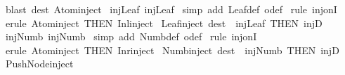 \begin{isabellebody}
%
\isadelimproof
%
\endisadelimproof
%
\isatagproof
{}\isamarkupfalse%
\ {\isacharparenleft}blast\ dest{\isacharbang}{\isacharcolon}\ Atom{\isacharunderscore}inject{\isacharparenright}%
\endisatagproof
{\isafoldproof}%
%
\isadelimproof
\isanewline
%
\endisadelimproof
\isanewline
{}\isamarkupfalse%
\ inj{\isacharunderscore}Leaf{\isacharcolon}\ {\isachardoublequoteopen}inj{\isacharparenleft}Leaf{\isacharparenright}{\isachardoublequoteclose}\isanewline
%
\isadelimproof
%
\endisadelimproof
%
\isatagproof
{}\isamarkupfalse%
\ {\isacharparenleft}simp\ add{\isacharcolon}\ Leaf{\isacharunderscore}def\ o{\isacharunderscore}def{\isacharparenright}\isanewline
{}\isamarkupfalse%
\ {\isacharparenleft}rule\ inj{\isacharunderscore}onI{\isacharparenright}\isanewline
{}\isamarkupfalse%
\ {\isacharparenleft}erule\ Atom{\isacharunderscore}inject\ {\isacharbrackleft}THEN\ Inl{\isacharunderscore}inject{\isacharbrackright}{\isacharparenright}\isanewline
{}\isamarkupfalse%
%
\endisatagproof
{\isafoldproof}%
%
\isadelimproof
\isanewline
%
\endisadelimproof
\isanewline
{}\isamarkupfalse%
\ Leaf{\isacharunderscore}inject\ {\isacharbrackleft}dest{\isacharbang}{\isacharbrackright}\ {\isacharequal}\ inj{\isacharunderscore}Leaf\ {\isacharbrackleft}THEN\ injD{\isacharbrackright}\isanewline
\isanewline
{}\isamarkupfalse%
\ inj{\isacharunderscore}Numb{\isacharcolon}\ {\isachardoublequoteopen}inj{\isacharparenleft}Numb{\isacharparenright}{\isachardoublequoteclose}\isanewline
%
\isadelimproof
%
\endisadelimproof
%
\isatagproof
{}\isamarkupfalse%
\ {\isacharparenleft}simp\ add{\isacharcolon}\ Numb{\isacharunderscore}def\ o{\isacharunderscore}def{\isacharparenright}\isanewline
{}\isamarkupfalse%
\ {\isacharparenleft}rule\ inj{\isacharunderscore}onI{\isacharparenright}\isanewline
{}\isamarkupfalse%
\ {\isacharparenleft}erule\ Atom{\isacharunderscore}inject\ {\isacharbrackleft}THEN\ Inr{\isacharunderscore}inject{\isacharbrackright}{\isacharparenright}\isanewline
{}\isamarkupfalse%
%
\endisatagproof
{\isafoldproof}%
%
\isadelimproof
\isanewline
%
\endisadelimproof
\isanewline
{}\isamarkupfalse%
\ Numb{\isacharunderscore}inject\ {\isacharbrackleft}dest{\isacharbang}{\isacharbrackright}\ {\isacharequal}\ inj{\isacharunderscore}Numb\ {\isacharbrackleft}THEN\ injD{\isacharbrackright}\isanewline
\isanewline
\isanewline
\isanewline
\isanewline
{}\isamarkupfalse%
\ Push{\isacharunderscore}Node{\isacharunderscore}inject{\isacharcolon}\isanewline

\end{isabellebody}
